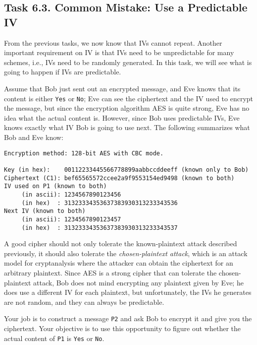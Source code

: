 


\subsection{Task 6.3. Common Mistake: Use a Predictable IV} 

From the previous tasks, we now know that IVs cannot 
repeat. Another important requirement on IV is that 
IVs need to be unpredictable for many schemes, i.e., IVs need to
be randomly generated. In this task, we will see what is going to happen if
IVs are predictable. 

Assume that Bob just sent out an encrypted message, and Eve knows that its 
content is either \texttt{Yes} or \texttt{No}; Eve can see the ciphertext and the IV used 
to encrypt the message, but since the encryption algorithm AES is quite
strong, Eve has no idea what the actual content is. However, since Bob uses
predictable IVs, Eve knows exactly what IV Bob is going to use next.
The following summarizes what Bob and Eve know:

\begin{lstlisting}
Encryption method: 128-bit AES with CBC mode.

Key (in hex):    00112233445566778899aabbccddeeff (known only to Bob)
Ciphertext (C1): bef65565572ccee2a9f9553154ed9498 (known to both)
IV used on P1 (known to both) 
     (in ascii): 1234567890123456 
     (in hex)  : 31323334353637383930313233343536 
Next IV (known to both)
     (in ascii): 1234567890123457 
     (in hex)  : 31323334353637383930313233343537 
\end{lstlisting}


A good cipher should not only tolerate the known-plaintext attack described
previously, it should also tolerate the \textit{chosen-plaintext attack}, 
which is an attack model for cryptanalysis where the attacker can obtain the
ciphertext for an arbitrary plaintext. Since AES is a strong cipher that 
can tolerate the chosen-plaintext attack, Bob does not mind encrypting any 
plaintext given by Eve; he does use a different IV for each plaintext, 
but unfortunately, the IVs he generates are not random, and they can
always be predictable.


Your job is to construct a message \texttt{P2} and ask Bob to encrypt it and give you the
ciphertext. Your objective is to use this opportunity to 
figure out whether the actual content of \texttt{P1}  is \texttt{Yes} or \texttt{No}.  



